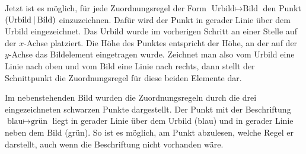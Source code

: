 \documentclass[../../main.tex]{subfiles}
\begin{document}
Jetzt ist es möglich, für jede Zuordnungsregel der Form $\text{Urbild}\mapsto\text{Bild}$ den Punkt $\left(\text{Urbild} \:\middle|\: \text{Bild}\right)$ einzuzeichnen. Dafür wird der Punkt in gerader Linie über dem Urbild eingezeichnet. Das Urbild wurde im vorherigen Schritt an einer Stelle auf der $x$-Achse platziert. Die Höhe des Punktes entspricht der Höhe, an der auf der $y$-Achse das Bildelement eingetragen wurde. Zeichnet man also vom Urbild eine Linie nach oben und vom Bild eine Linie nach rechts, dann stellt der Schnittpunkt die Zuordnungsregel für diese beiden Elemente dar.

\begin{example}{}
    
    Im nebenstehenden Bild wurden die Zuordnungsregeln durch die drei eingezeichneten schwarzen Punkte dargestellt. Der Punkt mit der Beschriftung $\text{blau}\mapsto\text{grün}$ liegt in gerader Linie über dem Urbild (blau) und in gerader Linie neben dem Bild (grün). So ist es möglich, am Punkt abzulesen, welche Regel er darstellt, auch wenn die Beschriftung nicht vorhanden wäre.
\end{example}
\end{document}
